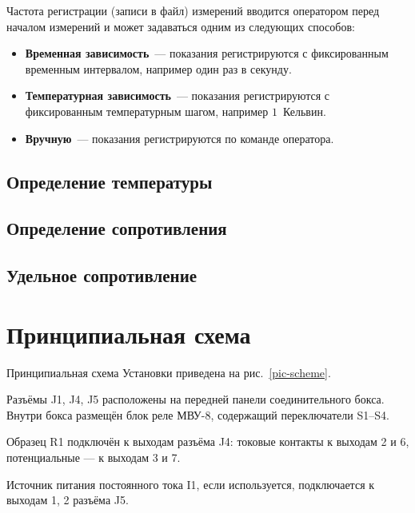 \documentclass[12pt, a4paper, twocolumn]{report}
\begin{document}
\label{sec_registration_types}

Частота регистрации (записи в файл) измерений вводится оператором перед началом измерений и может задаваться одним из следующих способов:

\begin{itemize}
\item {\bf Временная зависимость}~--- показания регистрируются с фиксированным временным интервалом, например один раз в секунду.
\item {\bf Температурная зависимость}~--- показания регистрируются с фиксированным температурным шагом, например $1$~Кельвин.
\item \label{sec_reg_type_manual} {\bf Вручную}~--- показания регистрируются по команде оператора.
\end{itemize}

\subsection{Определение температуры}



\subsection{Определение сопротивления}



\subsection{Удельное сопротивление}



\section{Принципиальная схема}

Принципиальная схема Установки приведена на рис.~\ref{pic-scheme}.

Разъёмы J1, J4, J5 расположены на передней панели соединительного бокса. Внутри бокса размещён блок реле МВУ-8, содержащий переключатели S1--S4.

Образец R1 подключён к выходам разъёма J4: токовые контакты к выходам 2 и 6, потенциальные --- к выходам 3 и 7.

Источник питания постоянного тока I1, если используется, подключается к выходам 1, 2 разъёма J5.
\end{document}
